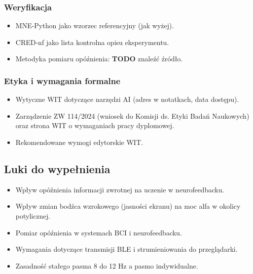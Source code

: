 \subsubsection*{Weryfikacja}

\begin{itemize}
    \item MNE-Python jako wzorzec referencyjny (jak wyżej).
    \item CRED-nf jako lista kontrolna opisu eksperymentu.
    \item Metodyka pomiaru opóźnienia: \textbf{TODO} znaleźć źródło.
\end{itemize}

\subsubsection*{Etyka i wymagania formalne}

\begin{itemize}
    \item Wytyczne WIT dotyczące narzędzi AI (adres w notatkach, data dostępu).
    \item Zarządzenie ZW 114/2024 (wniosek do Komisji ds. Etyki Badań
          Naukowych) oraz strona WIT o wymaganiach pracy dyplomowej.
    \item Rekomendowane wymogi edytorskie WIT.
\end{itemize}

\subsection{Luki do wypełnienia}

\begin{itemize}
    \item Wpływ opóźnienia informacji zwrotnej na uczenie w neurofeedbacku.
    \item Wpływ zmian bodźca wzrokowego (jasności ekranu) na moc alfa
          w okolicy potylicznej.
    \item Pomiar opóźnienia w systemach BCI i neurofeedbacku.
    \item Wymagania dotyczące transmisji BLE i strumieniowania
          do przeglądarki.
    \item Zasadność stałego pasma 8 do 12 Hz a pasmo indywidualne.
\end{itemize}
